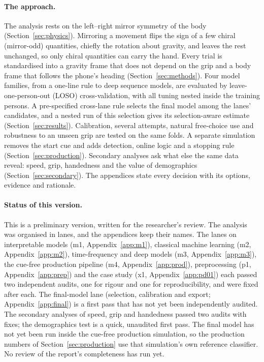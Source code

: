 \paragraph{The approach.} The analysis rests on the left--right mirror symmetry of the body
(Section~\ref{sec:physics}). Mirroring a movement flips the sign of a few chiral (mirror-odd) quantities, chiefly
the rotation about gravity, and leaves the rest unchanged, so only chiral quantities can carry the hand. Every trial
is standardised into a gravity frame that does not depend on the grip and a body frame that follows the phone's
heading (Section~\ref{sec:methods}). Four model families, from a one-line rule to deep sequence models, are
evaluated by leave-one-person-out (LOSO) cross-validation, with all tuning nested inside the training persons. A
pre-specified cross-lane rule selects the final model among the lanes' candidates, and a nested run of this
selection gives its selection-aware estimate (Section~\ref{sec:results}). Calibration, several attempts, natural free-choice use and
robustness to an unseen grip are tested on the same folds. A separate simulation removes the start cue and adds
detection, online logic and a stopping rule (Section~\ref{sec:production}). Secondary analyses ask what else the
same data reveal: speed, grip, handedness and the value of demographics (Section~\ref{sec:secondary}). The
appendices state every decision with its options, evidence and rationale.

\paragraph{Status of this version.} This is a preliminary version, written for the researcher's review. The
analysis was organised in lanes, and the appendices keep their names. The lanes on interpretable models (m1,
Appendix~\ref{app:m1}), classical machine learning (m2, Appendix~\ref{app:m2}), time-frequency and deep models
(m3, Appendix~\ref{app:m3}), the cue-free production pipeline (m4, Appendix~\ref{app:prod}), preprocessing (p1,
Appendix~\ref{app:prep}) and the case study (x1, Appendix~\ref{app:pd01}) each passed two independent audits, one
for rigour and one for reproducibility, and were fixed after each. The final-model lane (selection, calibration and
export; Appendix~\ref{app:final}) is a first pass that has not yet been independently audited. The secondary
analyses of speed, grip and handedness passed two audits with fixes; the demographics test is a quick, unaudited
first pass. The final model has not yet been run inside the cue-free production simulation, so the production
numbers of Section~\ref{sec:production} use that simulation's own reference classifier. No review of the
report's completeness has run yet.

